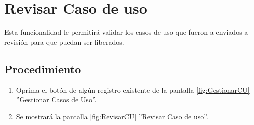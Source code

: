 \hypertarget{cv:revisarCU}{\section{Revisar Caso de uso}} \label{sec:revisarCU}

	Esta funcionalidad le permitirá validar los casos de uso que fueron a enviados a revisión para que puedan ser liberados.
		\subsection{Procedimiento}

			\begin{enumerate}
			
			\item Oprima el botón \IURevisar{} de algún registro existente de la pantalla \ref{fig:GestionarCU} ''Gestionar Casos de Uso''.
	
			\item Se mostrará la pantalla \ref{fig:RevisarCU} ''Revisar Caso de uso''.


\end{enumerate}
